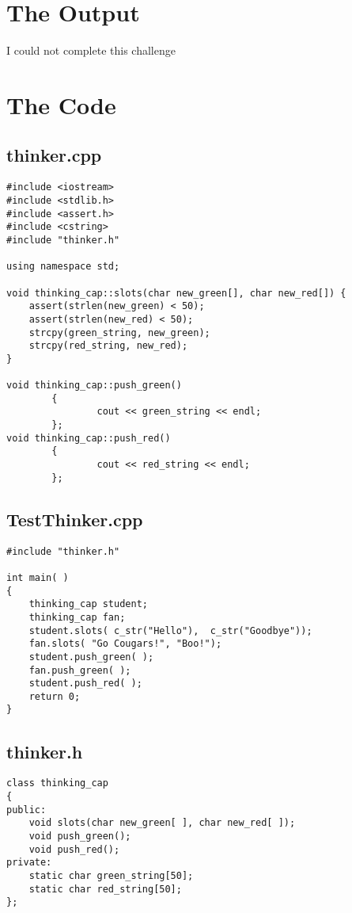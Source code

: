 \documentclass[11pt]{article}
\begin{document}
\section{The Output}
I could not complete this challenge

\section{The Code}
\subsection{thinker.cpp}
\begin{lstlisting}
#include <iostream>
#include <stdlib.h>
#include <assert.h>
#include <cstring>
#include "thinker.h"

using namespace std;

void thinking_cap::slots(char new_green[], char new_red[]) {
    assert(strlen(new_green) < 50);
    assert(strlen(new_red) < 50);
    strcpy(green_string, new_green);
    strcpy(red_string, new_red);
}

void thinking_cap::push_green()
        {
                cout << green_string << endl;
        };
void thinking_cap::push_red()
        {
                cout << red_string << endl;
        };

\end{lstlisting}

\subsection{TestThinker.cpp}
\begin{lstlisting}
#include "thinker.h"

int main( )
{
    thinking_cap student;
    thinking_cap fan;
    student.slots( c_str("Hello"),  c_str("Goodbye"));
    fan.slots( "Go Cougars!", "Boo!");
    student.push_green( );
    fan.push_green( );
    student.push_red( );
    return 0;
}

\end{lstlisting}

\subsection{thinker.h}
\begin{lstlisting}
class thinking_cap
{
public:
    void slots(char new_green[ ], char new_red[ ]);
    void push_green();
    void push_red();
private:
    static char green_string[50];
    static char red_string[50];
};
\end{lstlisting}
\end{document}
